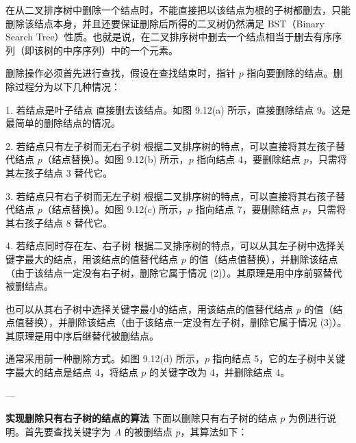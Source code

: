 \documentclass[lang=cn,newtx,10pt,scheme=chinese]{elegantbook}
\begin{document}
在从二叉排序树中删除一个结点时，不能直接把以该结点为根的子树都删去，只能删除该结点本身，并且还要保证删除后所得的二叉树仍然满足 BST（Binary Search Tree）性质。也就是说，在二叉排序树中删去一个结点相当于删去有序序列（即该树的中序序列）中的一个元素。

删除操作必须首先进行查找，假设在查找结束时，指针 $p$ 指向要删除的结点。删除过程分为以下几种情况：

1. 若结点是叶子结点  
   直接删去该结点。如图 9.12(a) 所示，直接删除结点 9。这是最简单的删除结点的情况。

2. 若结点只有左子树而无右子树  
   根据二叉排序树的特点，可以直接将其左孩子替代结点 $p$（结点替换）。如图 9.12(b) 所示，$p$ 指向结点 4，要删除结点 $p$，只需将其左孩子结点 3 替代它。

3. 若结点只有右子树而无左子树  
   根据二叉排序树的特点，可以直接将其右孩子替代结点 $p$（结点替换）。如图 9.12(c) 所示，$p$ 指向结点 7，要删除结点 $p$，只需将其右孩子结点 8 替代它。

4. 若结点同时存在左、右子树  
   根据二叉排序树的特点，可以从其左子树中选择关键字最大的结点，用该结点的值替代结点 $p$ 的值（结点值替换），并删除该结点（由于该结点一定没有右子树，删除它属于情况 (2)）。其原理是用中序前驱替代被删结点。

   也可以从其右子树中选择关键字最小的结点，用该结点的值替代结点 $p$ 的值（结点值替换），并删除该结点（由于该结点一定没有左子树，删除它属于情况 (3)）。其原理是用中序后继替代被删结点。

   通常采用前一种删除方式。如图 9.12(d) 所示，$p$ 指向结点 5，它的左子树中关键字最大的结点是结点 4，将结点 $p$ 的关键字改为 4，并删除结点 4。

---

\textbf{实现删除只有右子树的结点的算法}  
下面以删除只有右子树的结点 $p$ 为例进行说明。首先要查找关键字为 $A$ 的被删结点 $p$，其算法如下：
\end{document}
